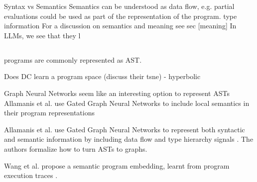 Syntax vs Semantics 
Semantics can be understood as data flow, e.g. partial evaluations could be used as part of the representation of the program. 
type information 
For a discussion on semantics and meaning see sec [meaning]
In LLMs, we see that they l









\subsection{}
programs are commonly represented as AST. 


Does DC learn a program space (discuss their tsne)
- hyperbolic

Graph Neural Networks seem like an interesting option to represent ASTs
Allamanis et al. use Gated Graph Neural Networks to include local semantics in their program representations 

Allamanis et al. use Gated Graph Neural Networks to represent both syntactic and semantic information by including data flow and type hierarchy signals \cite{allamanis2017learning}. The authors formalize how to turn ASTs to graphs.

Wang et al. propose a semantic program embedding, learnt from program execution traces \cite{wang2017dynamic}.

